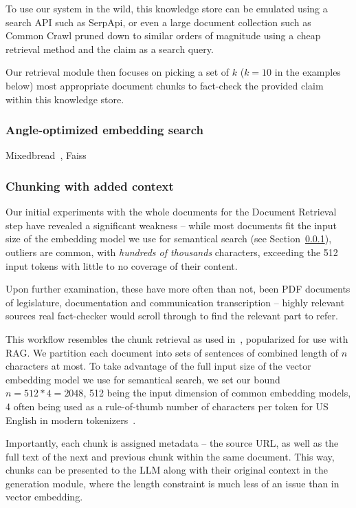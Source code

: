 To use our system in the wild, this knowledge store can be emulated using a search API such as SerpApi, or even a large document collection such as Common Crawl pruned down to similar orders of magnitude using a cheap retrieval method and the claim as a search query.

Our retrieval module then focuses on picking a set of $k$ ($k=10$ in the examples below) most appropriate document chunks to fact-check the provided claim within this knowledge store.

\subsubsection{Angle-optimized embedding search}
\label{sec:knn}
Mixedbread~\cite{li-li-2024-aoe,emb2024mxbai}, Faiss~\cite{douze2024faiss,johnson2019billion}

\subsubsection{Chunking with added context}
Our initial experiments with the whole \averitec{}  documents for the Document Retrieval step have revealed a significant weakness -- while most documents fit the input size of the embedding model we use for semantical search (see Section~\ref{sec:knn}), outliers are common, with \textit{hundreds of thousands} characters, exceeding the 512 input tokens with little to no coverage of their content.

Upon further examination, these have more often than not, been PDF documents of legislature, documentation and communication transcription -- highly relevant sources real fact-checker would scroll through to find the relevant part to refer. 

This workflow resembles the chunk retrieval as used in~\cite{rag}, popularized for use with RAG.
We partition each document into sets of sentences of combined length of $n$ characters at most.
To take advantage of the full input size of the vector embedding model we use for semantical search, we set our bound $n=512*4=2048$, 512 being the input dimension of common embedding models, 4 often being used as a rule-of-thumb number of characters per token for US English in modern tokenizers~\cite{tokens}.

Importantly, each chunk is  assigned metadata -- the source URL, as well as the full text of the next and previous chunk within the same document.
This way, chunks can be presented to the LLM along with their original context in the generation module, where the length constraint is much less of an issue than in vector embedding.

